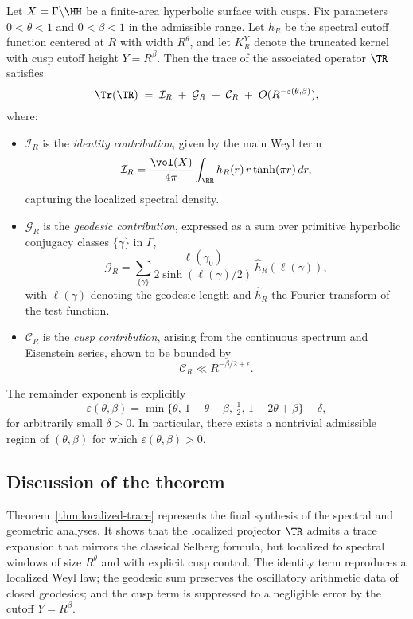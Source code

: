 \begin{theorem}
\label{thm:localized-trace}
Let $X=\Gamma \backslash \HH$ be a finite-area hyperbolic surface with cusps. 
Fix parameters $0<\theta<1$ and $0<\beta<1$ in the admissible range. 
Let $h_R$ be the spectral cutoff function centered at $R$ with width $R^\theta$, and let $K_R^Y$ denote the truncated kernel with cusp cutoff height $Y=R^\beta$. 
Then the trace of the associated operator $\TR$ satisfies
\[
\Tr(\TR) 
\;=\; \mathcal{I}_R \;+\; \mathcal{G}_R \;+\; \mathcal{C}_R \;+\; O(R^{-\varepsilon(\theta,\beta)}),
\]
where:
\begin{itemize}
\item $\mathcal{I}_R$ is the \emph{identity contribution}, given by the main Weyl term
\[
\mathcal{I}_R = \frac{\vol(X)}{4\pi} \int_{\RR} h_R(r)\, r\tanh(\pi r)\, dr,
\]
capturing the localized spectral density.
\item $\mathcal{G}_R$ is the \emph{geodesic contribution}, expressed as a sum over primitive hyperbolic conjugacy classes $\{\gamma\}$ in $\Gamma$,
\[
\mathcal{G}_R = \sum_{\{\gamma\}} \frac{\ell(\gamma_0)}{2\sinh(\ell(\gamma)/2)}\, \hat{h}_R(\ell(\gamma)),
\]
with $\ell(\gamma)$ denoting the geodesic length and $\hat{h}_R$ the Fourier transform of the test function.
\item $\mathcal{C}_R$ is the \emph{cusp contribution}, arising from the continuous spectrum and Eisenstein series, shown to be bounded by
\[
\mathcal{C}_R \ll R^{-\beta/2+\epsilon}.
\]
\end{itemize}
The remainder exponent is explicitly
\[
\varepsilon(\theta,\beta) = \min\{\theta,\,1-\theta+\beta,\,\tfrac12,\,1-2\theta+\beta\} - \delta,
\]
for arbitrarily small $\delta>0$. In particular, there exists a nontrivial admissible region of $(\theta,\beta)$ for which $\varepsilon(\theta,\beta)>0$.
\end{theorem}

\subsection{Discussion of the theorem}
Theorem~\ref{thm:localized-trace} represents the final synthesis of the spectral and geometric analyses. 
It shows that the localized projector $\TR$ admits a trace expansion that mirrors the classical Selberg formula, but localized to spectral windows of size $R^\theta$ and with explicit cusp control. 
The identity term reproduces a localized Weyl law; the geodesic sum preserves the oscillatory arithmetic data of closed geodesics; and the cusp term is suppressed to a negligible error by the cutoff $Y=R^\beta$. 

